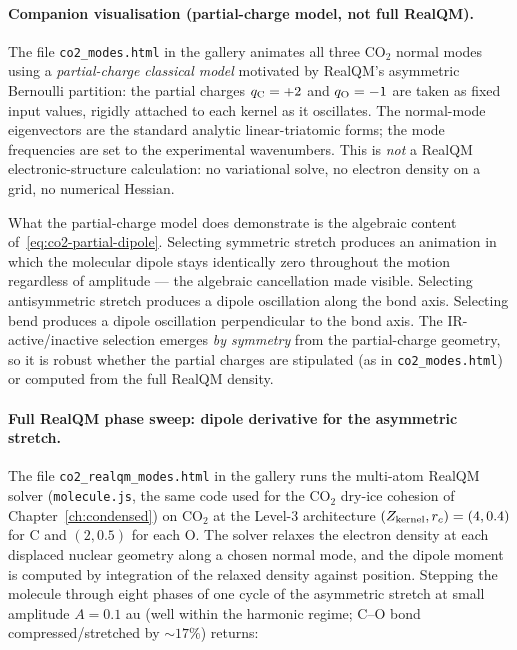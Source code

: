 \paragraph{Companion visualisation (partial-charge model, not full RealQM).}
The file \texttt{co2\_modes.html} in the gallery animates all three CO$_2$ normal modes using a \emph{partial-charge classical model} motivated by RealQM's asymmetric Bernoulli partition: the partial charges $q_{\rm C} = +2$ and $q_{\rm O} = -1$ are taken as fixed input values, rigidly attached to each kernel as it oscillates. The normal-mode eigenvectors are the standard analytic linear-triatomic forms; the mode frequencies are set to the experimental wavenumbers. This is \emph{not} a RealQM electronic-structure calculation: no variational solve, no electron density on a grid, no numerical Hessian.

What the partial-charge model does demonstrate is the algebraic content of~\eqref{eq:co2-partial-dipole}. Selecting symmetric stretch produces an animation in which the molecular dipole stays identically zero throughout the motion regardless of amplitude --- the algebraic cancellation made visible. Selecting antisymmetric stretch produces a dipole oscillation along the bond axis. Selecting bend produces a dipole oscillation perpendicular to the bond axis. The IR-active/inactive selection emerges \emph{by symmetry} from the partial-charge geometry, so it is robust whether the partial charges are stipulated (as in \texttt{co2\_modes.html}) or computed from the full RealQM density.

\paragraph{Full RealQM phase sweep: dipole derivative for the asymmetric stretch.}
The file \texttt{co2\_realqm\_modes.html} in the gallery runs the multi-atom RealQM solver (\texttt{molecule.js}, the same code used for the CO$_2$ dry-ice cohesion of Chapter~\ref{ch:condensed}) on CO$_2$ at the Level-3 architecture $(Z_{\rm kernel}, r_c) = (4, 0.4)$ for C and $(2, 0.5)$ for each O. The solver relaxes the electron density at each displaced nuclear geometry along a chosen normal mode, and the dipole moment is computed by integration of the relaxed density against position. Stepping the molecule through eight phases of one cycle of the asymmetric stretch at small amplitude $A = 0.1$ au (well within the harmonic regime; C--O bond compressed/stretched by $\sim 17\%$) returns:

